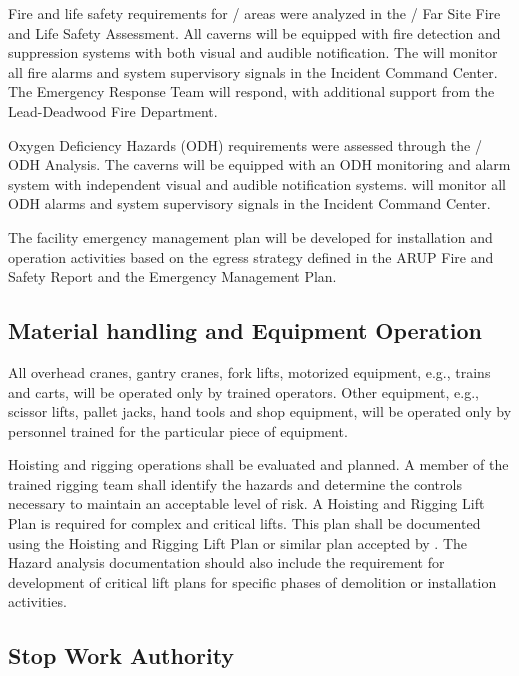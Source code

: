 Fire and life safety requirements for / areas
were analyzed in the / Far Site Fire and Life
Safety Assessment. All caverns will be equipped with fire detection
and suppression systems with both visual and audible notification. The
 will monitor all fire alarms and system supervisory signals in
the  Incident Command Center.  The  Emergency Response Team
will respond, with additional support from the Lead-Deadwood Fire
Department.

Oxygen Deficiency Hazards (ODH) requirements were assessed through the
/ ODH Analysis. The caverns will be equipped
with an ODH monitoring and alarm system with independent visual and
audible notification systems.  will monitor all ODH alarms and
system supervisory signals in the  Incident Command Center.

The facility emergency management plan will be developed for
installation and operation activities based on the egress strategy
defined in the ARUP Fire and Safety Report and the  Emergency
Management Plan.

\subsection{Material handling and Equipment Operation}

All overhead cranes, gantry cranes, fork lifts, motorized equipment,
e.g., trains and carts, will be operated only by trained
operators. Other equipment, e.g., scissor lifts, pallet jacks, hand
tools and shop equipment, will be operated only by personnel trained
for the particular piece of equipment.

Hoisting and rigging operations shall be evaluated and planned.  A
member of the trained rigging team shall identify the hazards and
determine the controls necessary to maintain an acceptable level of
risk.  A Hoisting and Rigging Lift Plan is required for complex and
critical lifts. This plan shall be documented using the \fnal Hoisting
and Rigging Lift Plan or similar plan accepted by \fnal. The Hazard
analysis documentation should also include the requirement for
development of critical lift plans for specific phases of demolition
or installation activities.

\subsection{Stop Work Authority}

